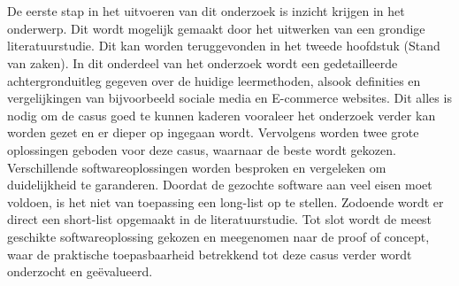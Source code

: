 
\chapter{}%
\label{ch:methodologie}



De eerste stap in het uitvoeren van dit onderzoek is inzicht krijgen in het onderwerp. Dit wordt mogelijk gemaakt door het uitwerken van een grondige literatuurstudie. Dit kan worden teruggevonden in het tweede hoofdstuk (Stand van zaken). In dit onderdeel van het onderzoek wordt een gedetailleerde achtergronduitleg gegeven over de huidige leermethoden, alsook definities en vergelijkingen van bijvoorbeeld sociale media en E-commerce websites. Dit alles is nodig om de casus goed te kunnen kaderen vooraleer het onderzoek verder kan worden gezet en er dieper op ingegaan wordt. Vervolgens worden twee grote oplossingen geboden voor deze casus, waarnaar de beste wordt gekozen. Verschillende softwareoplossingen worden besproken en vergeleken om duidelijkheid te garanderen. Doordat de gezochte software aan veel eisen moet voldoen, is het niet van toepassing een long-list op te stellen. Zodoende wordt er direct een short-list opgemaakt in de literatuurstudie. Tot slot wordt de meest geschikte softwareoplossing gekozen en meegenomen naar de proof of concept, waar de praktische toepasbaarheid betrekkend tot deze casus verder wordt onderzocht en geëvalueerd.\newline

